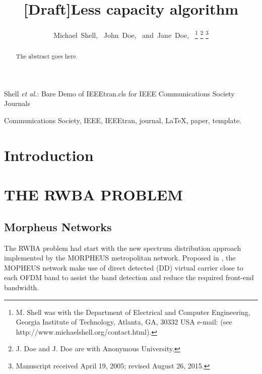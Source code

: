 \documentclass[journal,comsoc]{IEEEtran}
\begin{document}
\title{[Draft]Less capacity algorithm}

\author{Michael~Shell,~
        John~Doe,~
        and~Jane~Doe,~%
\thanks{M. Shell was with the Department
of Electrical and Computer Engineering, Georgia Institute of Technology, Atlanta,
GA, 30332 USA e-mail: (see http://www.michaelshell.org/contact.html).}%
\thanks{J. Doe and J. Doe are with Anonymous University.}%
\thanks{Manuscript received April 19, 2005; revised August 26, 2015.}}

%
{Shell \MakeLowercase{\textit{et al.}}: Bare Demo of IEEEtran.cls for IEEE Communications Society Journals}

\maketitle

\begin{abstract}
The abstract goes here.
\end{abstract}

\begin{IEEEkeywords}
Communications Society, IEEE, IEEEtran, journal, \LaTeX, paper, template.
\end{IEEEkeywords}

\IEEEpeerreviewmaketitle

\section{Introduction}

\section{THE RWBA PROBLEM}

\subsection{Morpheus Networks}

The RWBA problem had start with the new spectrum distribution approach implemented by the MORPHEUS metropolitan network. Proposed in \cite{ofc_2014_morpheus}, the MOPHEUS network make use of direct detected (DD) virtual carrier close to each OFDM band to assist the band detection and reduce the required front-end bandwidth.
\end{document}
